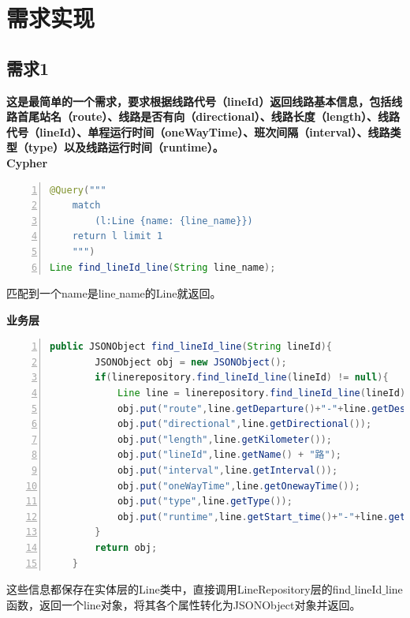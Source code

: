 \documentclass[11pt,a4paper]{article}
\begin{document}
\newpage
\section{需求实现}
\subsection{需求1}
\textbf{这是最简单的一个需求，要求根据线路代号（lineId）返回线路基本信息，包括线路首尾站名（route）、线路是否有向（directional）、线路长度（length）、线路代号（lineId）、单程运行时间（oneWayTime）、班次间隔（interval）、线路类型（type）以及线路运行时间（runtime）。} \\
\textbf{Cypher} \\
\begin{lstlisting}[numbers = left, 
showstringspaces=false,
showspaces = false,
breaklines = true, 
language=Java]
@Query(""" 
	match
		(l:Line {name: {line_name}})
	return l limit 1
	""")
Line find_lineId_line(String line_name);
\end{lstlisting} 
匹配到一个name是line$\_$name的Line就返回。

\textbf{业务层} \\
\begin{lstlisting}[numbers = left, 
showstringspaces=false,
showspaces = false,
breaklines = true, 
language=Java]
    public JSONObject find_lineId_line(String lineId){
        JSONObject obj = new JSONObject();
        if(linerepository.find_lineId_line(lineId) != null){
            Line line = linerepository.find_lineId_line(lineId);
            obj.put("route",line.getDeparture()+"-"+line.getDestination());
            obj.put("directional",line.getDirectional());
            obj.put("length",line.getKilometer());
            obj.put("lineId",line.getName() + "路");
            obj.put("interval",line.getInterval());
            obj.put("oneWayTime",line.getOnewayTime());
            obj.put("type",line.getType());
            obj.put("runtime",line.getStart_time()+"-"+line.getEnd_time());
        }
        return obj;
    }
\end{lstlisting} 
这些信息都保存在实体层的Line类中，直接调用LineRepository层的find$\_$lineId$\_$line函数，返回一个line对象，将其各个属性转化为JSONObject对象并返回。
\end{document}
